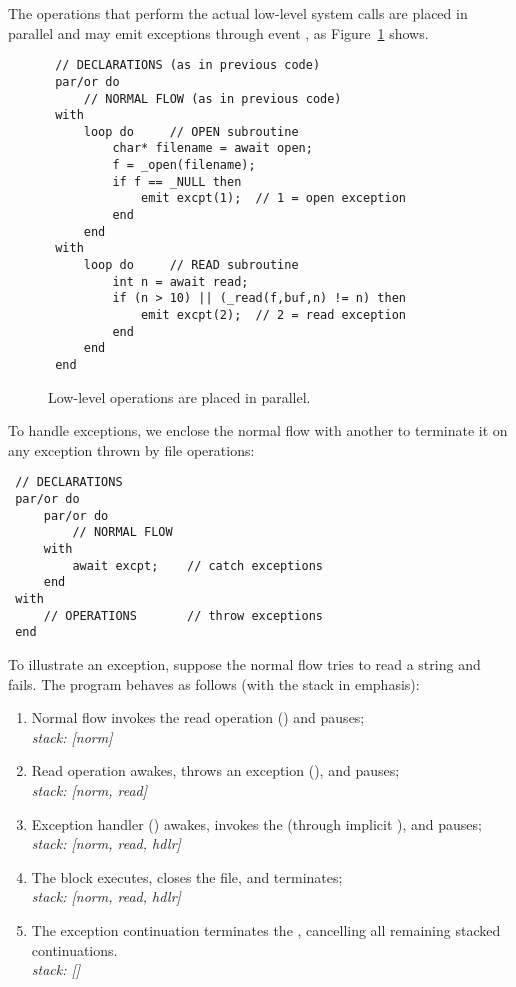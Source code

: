 The operations that perform the actual low-level system calls are placed in 
parallel and may emit exceptions through event , as 
Figure~\ref{lst:excpt2} shows.

\begin{figure}[t]
{\small
\begin{verbatim}
 // DECLARATIONS (as in previous code)
 par/or do
     // NORMAL FLOW (as in previous code)
 with
     loop do     // OPEN subroutine
         char* filename = await open;
         f = _open(filename);
         if f == _NULL then
             emit excpt(1);  // 1 = open exception
         end
     end
 with
     loop do     // READ subroutine
         int n = await read;
         if (n > 10) || (_read(f,buf,n) != n) then
             emit excpt(2);  // 2 = read exception
         end
     end
 end
\end{verbatim}
}%
\caption{ Low-level operations are placed in parallel.
\label{lst:excpt2}
}
\end{figure}

To handle exceptions, we enclose the normal flow with another  to 
terminate it on any exception thrown by file operations:

{\small
\begin{verbatim}
 // DECLARATIONS
 par/or do
     par/or do
         // NORMAL FLOW
     with
         await excpt;    // catch exceptions
     end
 with
     // OPERATIONS       // throw exceptions
 end
\end{verbatim}
}

To illustrate an exception, suppose the normal flow tries to read a string and 
fails.
The program behaves as follows (with the stack in emphasis):

{\small
\begin{enumerate}
\setlength{\itemsep}{0pt}
\item Normal flow invokes the read operation () and pauses;\\
    \emph{stack: [norm]}
\item Read operation awakes, throws an exception (), and 
    pauses;\\
    \emph{stack: [norm, read]}
\item Exception handler () awakes, invokes the \FIN (through 
    implicit ), and pauses;\\
    \emph{stack: [norm, read, hdlr]}
\item The \FIN block executes, closes the file, and terminates;\\
    \emph{stack: [norm, read, hdlr]}
\item The exception continuation terminates the , cancelling all 
remaining stacked continuations.\\
    \emph{stack: []}
\end{enumerate}
}

